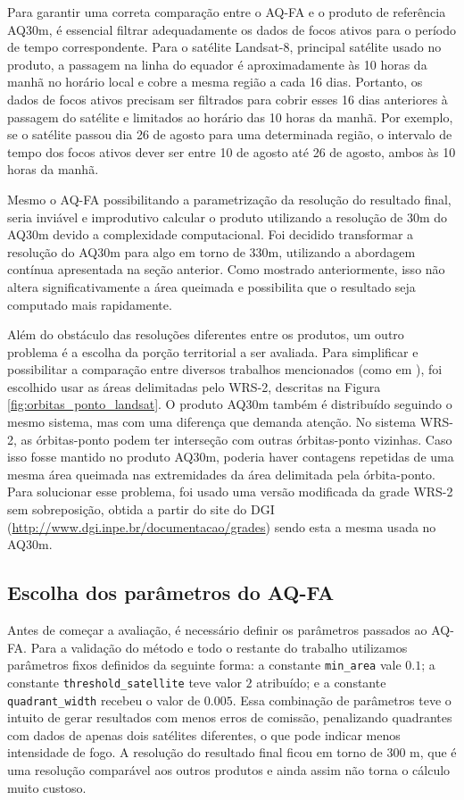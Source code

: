 \documentclass[cic,tc]{iiufrgs}
\begin{document}
Para garantir uma correta comparação entre o AQ-FA e o produto de referência AQ30m, é essencial filtrar adequadamente os dados de focos ativos para o período de tempo correspondente. Para o satélite Landsat-8, principal satélite usado no produto, a passagem na linha do equador é aproximadamente às 10 horas da manhã no horário local e cobre a mesma região a cada 16 dias. Portanto, os dados de focos ativos precisam ser filtrados para cobrir esses 16 dias anteriores à passagem do satélite e limitados ao horário das 10 horas da manhã. Por exemplo, se o satélite passou dia 26 de agosto para uma determinada região, o intervalo de tempo dos focos ativos dever ser entre 10 de agosto até 26 de agosto, ambos às 10 horas da manhã.

Mesmo o AQ-FA possibilitando a parametrização da resolução do resultado final, seria inviável e improdutivo calcular o produto utilizando a resolução de 30m do AQ30m devido a complexidade computacional. Foi decidido transformar a resolução do AQ30m para algo em torno de 330m, utilizando a abordagem contínua apresentada na seção anterior. Como mostrado anteriormente, isso não altera significativamente a área queimada e possibilita que o resultado seja computado mais rapidamente.

Além do obstáculo das resoluções diferentes entre os produtos, um outro problema é a escolha da porção territorial a ser avaliada. Para simplificar e possibilitar a comparação entre diversos trabalhos mencionados (como em \citet{libonati2015algorithm}), foi escolhido usar as áreas delimitadas pelo WRS-2, descritas na Figura \ref{fig:orbitas_ponto_landsat}. O produto AQ30m também é distribuído seguindo o mesmo sistema, mas com uma diferença que demanda atenção. No sistema WRS-2, as órbitas-ponto podem ter interseção com outras órbitas-ponto vizinhas. Caso isso fosse mantido no produto AQ30m, poderia haver contagens repetidas de uma mesma área queimada nas extremidades da área delimitada pela órbita-ponto. Para solucionar esse problema, foi usado uma versão modificada da grade WRS-2 sem sobreposição, obtida a partir do site do DGI (\url{http://www.dgi.inpe.br/documentacao/grades}) sendo esta a mesma usada no AQ30m.

\subsection*{Escolha dos parâmetros do AQ-FA}

Antes de começar a avaliação, é necessário definir os parâmetros passados ao AQ-FA. Para a validação do método e todo o restante do trabalho utilizamos parâmetros fixos definidos da seguinte forma: a constante \texttt{min\_area} vale $0.1$; a constante \texttt{threshold\_satellite} teve valor $2$ atribuído; e a constante \texttt{quadrant\_width} recebeu o valor de $0.005$. Essa combinação de parâmetros teve o intuito de gerar resultados com menos erros de comissão, penalizando quadrantes com dados de apenas dois satélites diferentes, o que pode indicar menos intensidade de fogo. A resolução do resultado final ficou em torno de 300 m, que é uma resolução comparável aos outros produtos e ainda assim não torna o cálculo muito custoso.
\end{document}
